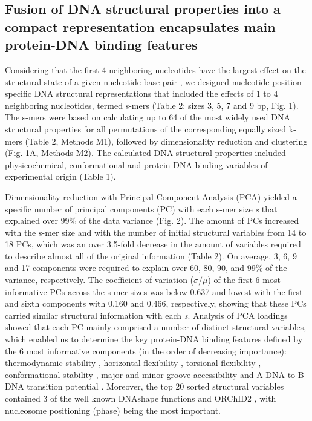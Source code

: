 \documentclass[sigconf]{acmart}
\begin{document}
\subsection{Fusion of DNA structural properties into a compact representation encapsulates main protein-DNA binding features}
Considering that the first 4 neighboring nucleotides have the largest effect on the structural state of a given nucleotide base pair \cite{Zrimec2015-xf,Peyrard2009-as}, we designed nucleotide-position specific DNA structural representations that included the effects of 1 to 4 neighboring nucleotides, termed s-mers (Table 2: sizes 3, 5, 7 and 9 bp, Fig. 1). The s-mers were based on calculating up to 64 of the most widely used DNA structural properties for all permutations of the corresponding equally sized k-mers (Table 2, Methods M1), followed by dimensionality reduction and clustering (Fig. 1A, Methods M2). The calculated DNA structural properties included physicochemical, conformational and protein-DNA binding variables of experimental origin \cite{Zrimec2020-wx} (Table 1). 

Dimensionality reduction with Principal Component Analysis (PCA) yielded a specific number of principal components (PC) with each s-mer size \textit{s} that explained over 99\% of the data variance (Fig. 2). The amount of PCs increased with the s-mer size and with the number of initial structural variables from 14 to 18 PCs, which was an over 3.5-fold decrease in the amount of variables required to describe almost all of the original information (Table 2). On average, 3, 6, 9 and 17 components were required to explain over 60, 80, 90, and 99\% of the variance, respectively. The coefficient of variation (\(\sigma/\mu\)) of the first 6 most informative PCs across the s-mer sizes was below 0.637 and lowest with the first and sixth components with 0.160 and 0.466, respectively, showing that these PCs carried similar structural information with each \textit{s}. Analysis of PCA loadings showed that each PC mainly comprised a number of distinct structural variables, which enabled us to determine the key protein-DNA binding features defined by the 6 most informative components (in the order of decreasing importance): thermodynamic stability \cite{SantaLucia1998-hc,Protozanova2004-xc}, horizontal flexibility \cite{Olson1998-rw,Brukner1995-pt,Bolshoy1991-ux,Gorin1995-es,Karas1996-qz,Chiu2016-kb}, torsional flexibility \cite{Perez2004-sx,Kabsch1982-tv,Olson1998-rw,Karas1996-qz}, conformational stability \cite{SantaLucia1998-hc,Aida1988-iq,Perez2004-sx,Packer2000-ri,Geggier2010-mw}, major and minor groove accessibility \cite{Protozanova2004-xc,Kabsch1982-tv,Gorin1995-es,Olson1998-rw} and A-DNA to B-DNA transition potential \cite{Aida1988-iq,Perez2004-sx,Gorin1995-es,Karas1996-qz}. Moreover, the top 20 sorted structural variables contained 3 of the well known DNAshape functions \cite{Chiu2016-kb,Rohs2009-hm} and ORChID2 \cite{Bishop2011-jm}, with nucleosome positioning (phase) \cite{Satchwell1986-me} being the most important.
\end{document}
